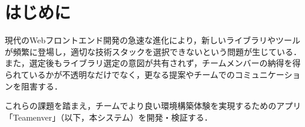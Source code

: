 \documentclass[main]{subfiles}
\begin{document}
\section{はじめに }
現代のWebフロントエンド開発の急速な進化により，新しいライブラリやツールが頻繁に登場し，適切な技術スタックを選択できないという問題が生じている．\cite{medium.com}
また，選定後もライブラリ選定の意図が共有されず，チームメンバーの納得を得られているかが不透明なだけでなく，更なる提案やチームでのコミュニケーションを阻害する．

これらの課題を踏まえ，チームでより良い環境構築体験を実現するためのアプリ「Teamenver」（以下，本システム）を開発・検証する．
\end{document}
